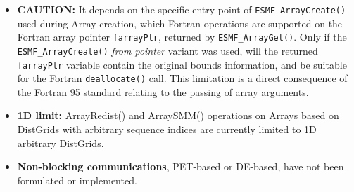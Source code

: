 
\begin{itemize}
\label{Array:rest}

\item {\bf CAUTION:} It depends on the specific entry point of {\tt ESMF\_ArrayCreate()} used during Array creation, which Fortran operations are supported on the Fortran array pointer {\tt farrayPtr}, returned by {\tt ESMF\_ArrayGet()}. Only if the {\tt ESMF\_ArrayCreate()} {\em from pointer} variant was used, will the returned {\tt farrayPtr} variable contain the original bounds information, and be suitable for the Fortran {\tt deallocate()} call. This limitation is a direct consequence of the Fortran 95 standard relating to the passing of array arguments.

\item {\bf 1D limit:} ArrayRedist() and ArraySMM() operations on Arrays based on DistGrids with arbitrary sequence indices are currently limited to 1D arbitrary DistGrids.

\item {\bf Non-blocking communications}, PET-based or DE-based, have not been formulated or implemented.



\end{itemize}
